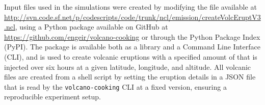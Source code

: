 \documentclass{ametsocV6.1}
\begin{document}
%






%



\appendix

\appendix[A]


Input files used in the simulations were created by modifying the file available at
\url{http://svn.code.sf.net/p/codescripts/code/trunk/ncl/emission/createVolcEruptV3.ncl},
using a Python package available on GitHub at
\url{https://github.com/engeir/volcano-cooking} or through the Python Package Index
(PyPI). The package is available both as a library and a Command Line Interface (CLI),
and is used to create volcanic eruptions with a specified amount of  that is
injected over six hours at a given latitude, longitude, and altitude. All volcanic
 files are created from a shell script by setting the eruption details in a JSON
file that is read by the \texttt{volcano-cooking} CLI at a fixed version, ensuring a
reproducible experiment setup.
\end{document}
